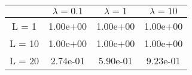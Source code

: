 \begin{tabular}{cccc}
& $\lambda = 0.1$ & $\lambda = 1$ & $\lambda = 10$ \\
\hline
L = 1 & 1.00e+00 & 1.00e+00 & 1.00e+00 \\
L = 10 & 1.00e+00 & 1.00e+00 & 1.00e+00 \\
L = 20 & 2.74e-01 & 5.90e-01 & 9.23e-01 \\
\hline
\end{tabular}
